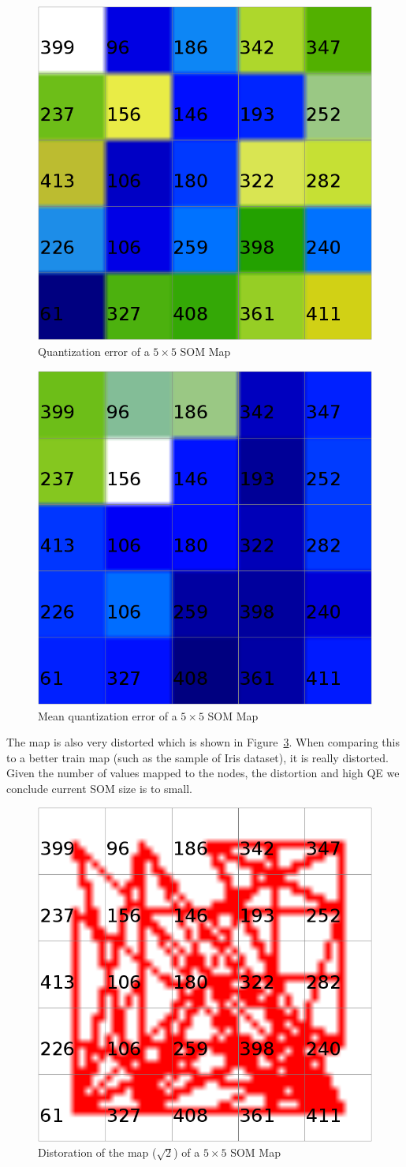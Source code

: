 \documentclass{acm_proc_article-sp}
\begin{document}
\begin{figure}
\centering
\includegraphics[width=0.5\linewidth]{img/wine-small-quant-error}
\caption{Quantization error of a $5\times5$ SOM Map}
\label{fig:wine-small-quant-error}
\end{figure}

\begin{figure}
\centering
\includegraphics[width=0.5\linewidth]{img/wine-small-mean-quant-error}
\caption{Mean quantization error of a $5\times5$ SOM Map}
\label{fig:wine-small-mean-quant-error}
\end{figure}

The map is also very distorted which is shown in Figure~\ref{fig:wine-small-dist-sqrt-2}.
When comparing this to a better train map (such as the sample of Iris dataset), it is
really distorted. Given the number of values mapped to the nodes, the distortion and
high QE we conclude current SOM size is to small.

\begin{figure}
\centering
\includegraphics[width=0.5\linewidth]{img/wine-small-dist-sqrt-2}
\caption{Distoration of the map ($\sqrt{2}$) of a $5\times5$ SOM Map}
\label{fig:wine-small-dist-sqrt-2}
\end{figure}
\end{document}
